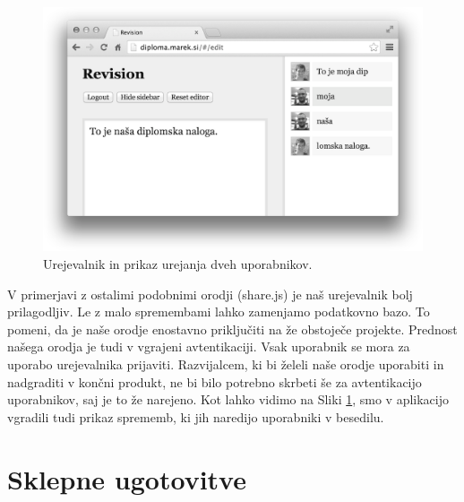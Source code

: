 \documentclass[a4paper, 12pt, twoside]{book}
\begin{document}
\begin{figure}[placement h]
\begin{center}
\includegraphics[width=14cm]{img/revision-editor.png}
\end{center}
\caption{Urejevalnik in prikaz urejanja dveh uporabnikov.}
\label{rev-edt}
\end{figure}

V primerjavi z ostalimi podobnimi orodji (share.js) je naš urejevalnik bolj prilagodljiv. Le z malo spremembami lahko zamenjamo podatkovno bazo. To pomeni, da je naše orodje enostavno priključiti na že obstoječe projekte. Prednost našega orodja je tudi v vgrajeni avtentikaciji. Vsak uporabnik se mora za uporabo urejevalnika prijaviti. Razvijalcem, ki bi želeli naše orodje uporabiti in nadgraditi v končni produkt, ne bi bilo potrebno skrbeti še za avtentikacijo uporabnikov, saj je to že narejeno. Kot lahko vidimo na Sliki \ref{rev-edt}, smo v aplikacijo vgradili tudi prikaz sprememb, ki jih naredijo uporabniki v besedilu.

\chapter{Sklepne ugotovitve}
\end{document}
